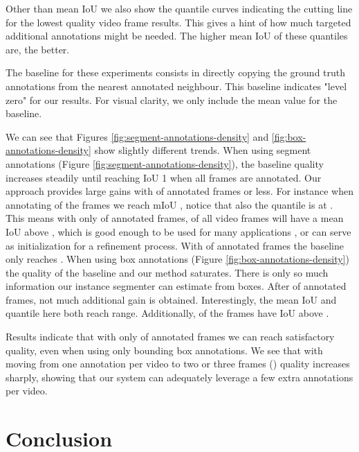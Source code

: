 \documentclass[10pt,twocolumn,letterpaper]{article}
\makeatletter
\renewcommand{\paragraph}{\@startsection{paragraph}{4}{\z@}{0.5ex \@plus 1ex \@minus .2ex}{-0.5em}{\normalfont \normalsize \bfseries}}
\makeatother
\begin{document}
Other than mean IoU we also show the quantile curves indicating the cutting line for the  lowest quality video frame results. This gives a hint of how much targeted additional annotations might be needed.
The higher mean IoU of these quantiles are, the better.

The baseline for these experiments consists in directly copying the ground truth annotations from the nearest annotated neighbour. This baseline indicates "level zero" for our results. For visual clarity, we only include the mean value
for the baseline.


\paragraph{Analysis}
We can see that Figures \ref{fig:segment-annotations-density} and \ref{fig:box-annotations-density} show slightly different trends. When using segment annotations (Figure \ref{fig:segment-annotations-density}),
the baseline quality increases
steadily until reaching IoU 1 when all frames are annotated. Our   approach provides large gains with  of annotated frames or less. For instance when annotating  of the frames we reach mIoU ,
notice that also the  quantile is at . This means with only  of annotated frames,  of all video frames will have a mean IoU above , which is good enough to be used for many applications
, or can serve as initialization for a refinement process. With  of annotated frames the baseline only reaches .
When using box annotations (Figure \ref{fig:box-annotations-density}) the quality of the baseline and our method saturates. There is only so much information our instance segmenter can estimate from boxes. After  of
annotated frames, not much additional gain is obtained. Interestingly, the mean IoU and  quantile here both reach  range. Additionally,  of the frames have IoU above .

\paragraph{Conclusion}
Results indicate that with only  of annotated frames we can reach satisfactory quality, even when using only bounding box annotations. We see that with moving from one annotation per video to two or three
frames () quality increases sharply, showing that our system can adequately leverage a few extra annotations per video.






 \section{Conclusion}
\label{sec:conclusion}
\end{document}
